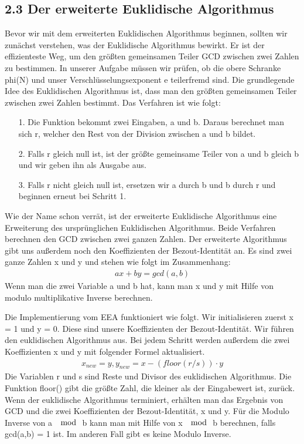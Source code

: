 \documentclass[course=asp]{aspdoc}
\begin{document}
\subsection*{2.3 Der erweiterte Euklidische Algorithmus}
Bevor wir mit dem erweiterten Euklidischen Algorithmus beginnen, sollten wir zunächst verstehen, was der Euklidische Algorithmus bewirkt. Er ist der effizienteste Weg, um den größten gemeinsamen Teiler GCD zwischen zwei Zahlen zu bestimmen. In unserer Aufgabe müssen wir prüfen, ob die obere Schranke phi(N) und unser Verschlüsselungsexponent e teilerfremd sind. Die grundlegende Idee des Euklidischen Algorithmus ist, dass man den größten gemeinsamen Teiler zwischen zwei Zahlen bestimmt. Das Verfahren ist wie folgt:
\begin{itemize}
 \item [1.] Die Funktion bekommt zwei Eingaben, a und b. Daraus berechnet man sich r, welcher den Rest von der Division zwischen a und b bildet.
 \item [2.] Falls r gleich null ist, ist der größte gemeinsame Teiler von a und b gleich b und wir geben ihn als Ausgabe aus.
 \item [3.] Falls r nicht gleich null ist, ersetzen wir a durch b und b durch r und beginnen erneut bei Schritt 1. 
\end{itemize}
Wie der Name schon verrät, ist der erweiterte Euklidische Algorithmus eine Erweiterung des ursprünglichen Euklidischen Algorithmus. Beide Verfahren berechnen den GCD zwischen zwei ganzen Zahlen. Der erweiterte Algorithmus gibt uns außerdem noch den Koeffizienten der Bezout-Identität an. Es sind zwei ganze Zahlen x und y und stehen wie folgt im Zusammenhang:
\begin{align}
	ax + by = gcd(a, b)
\end{align} 
Wenn man die zwei Variable a und b hat, kann man x und y mit Hilfe von modulo multiplikative Inverse berechnen.

Die Implementierung vom EEA funktioniert wie folgt. Wir initialisieren zuerst x = 1 und y = 0. Diese sind unsere Koeffizienten der Bezout-Identität. Wir führen den euklidischen Algorithmus aus. Bei jedem Schritt werden außerdem die zwei Koeffizienten x und y mit folgender Formel aktualisiert. 
\begin{align}
	x_{new} = y, y_{new} = x - (floor(r/s)) \cdot y
\end{align} 
Die Variablen r und s sind Reste und Divisor des euklidischen Algorithmus. Die Funktion floor() gibt die größte Zahl, die kleiner als der Eingabewert ist, zurück. 
Wenn der euklidische Algorithmus terminiert, erhälten man das Ergebnis von GCD und die zwei Koeffizienten der Bezout-Identität, x und y. Für die Modulo Inverse von a $\mod$ b kann man mit Hilfe von x $\mod$ b berechnen, falls gcd(a,b) = 1 ist. Im anderen Fall gibt es keine Modulo Inverse.
 
\end{document}
